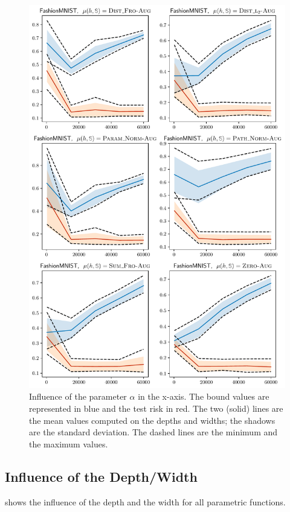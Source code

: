 \begin{noaddcontents}
\begin{figure}
    \centering
    \includegraphics[width=0.77\linewidth]{chapter_7/figures/influence_alpha_fashion_aug.pdf}
    \caption{
    Influence of the parameter $\alpha$ in the x-axis.
    The bound values are represented in blue and the test risk in red. 
    The two (solid) lines are the mean values computed on the depths and widths; the shadows are the standard deviation.
    The dashed lines are the minimum and the maximum values.
    }
    \label{ap:dis-mu:fig:influence-alpha-4}
\end{figure}

\subsection{Influence of the Depth/Width}

 shows the influence of the depth and the width for all parametric functions.


\end{noaddcontents}
